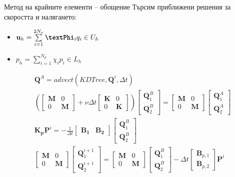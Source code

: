 \documentclass{beamer}
\newcommand{\vecf}[1]{\textbf{#1}}
\begin{document}
    \begin{frame}{Метод на крайните елементи -- обощение}
        	Търсим приближени решения за скоростта и налягането:
    		\begin{itemize}
    			\item $\vecf{u}_h = \sum\limits_{i=1}^{2N_v}{\vecf{\textPhi}_iq_i} \in U_h$
    			\item $p_h = \sum\limits_{i=1}^{N_p}{\chi_ip_i} \in L_h$
		\end{itemize}
        	\begin{align*}
	&\vecf{Q}^A = advect(KDTree, \vecf{Q}^i, \Delta t)\\
		&\left(\begin{bmatrix}
		\mathbf{M} & 0 \\
		0 & \mathbf{M}
	\end{bmatrix} + \nu\Delta t\begin{bmatrix}
		\mathbf{K} & 0 \\
		0 & \mathbf{K}
	\end{bmatrix}\right)\begin{bmatrix}
		\vecf{Q}^{B}_1 \\
		\vecf{Q}^{B}_2
	\end{bmatrix} = \begin{bmatrix}
		\mathbf{M} & 0 \\
		0 & \mathbf{M}
	\end{bmatrix}\begin{bmatrix}
		\vecf{Q}^{A}_1 \\
		\vecf{Q}^{A}_2
	\end{bmatrix}\\
	&\mathbf{K_p}\vecf{P}^i = -\frac{1}{\Delta t} \begin{bmatrix}
		\mathbf{B_1} & \mathbf{B_2}
	\end{bmatrix} \begin{bmatrix}
		\vecf{Q}^{B}_1 \\
		\vecf{Q}^{B}_2
	\end{bmatrix}\\
	&\begin{bmatrix}
		\mathbf{M} & 0 \\
		0 & \mathbf{M}
	\end{bmatrix} \begin{bmatrix}
		\vecf{Q}^{i+1}_1 \\
		\vecf{Q}^{i+1}_2
	\end{bmatrix} =	\begin{bmatrix}
		\mathbf{M} & 0 \\
		0 & \mathbf{M}
	\end{bmatrix} \begin{bmatrix}
		\vecf{Q}^{B}_1 \\
		\vecf{Q}^{B}_2
	\end{bmatrix} - \Delta t \begin{bmatrix}
		\vecf{B}_{p,1} \\
		\vecf{B}_{p,2}
	\end{bmatrix} \vecf{P}^i
\end{align*}
    \end{frame}
    
\end{document}
